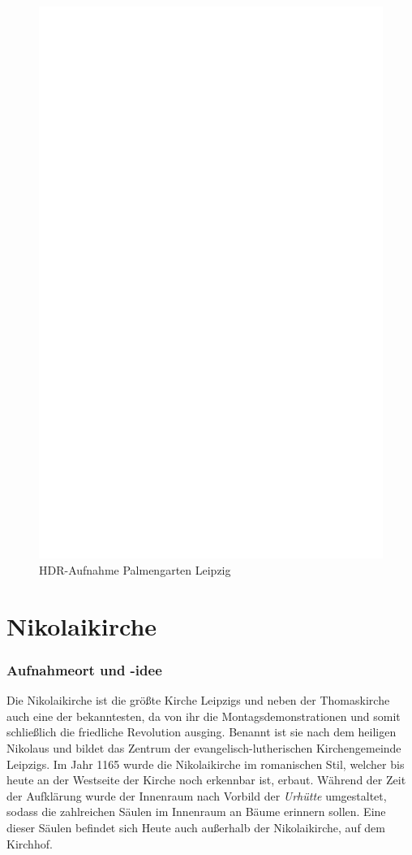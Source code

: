 \documentclass[liststotoc,bibtotoc,fontsize=14pt,]{scrreprt}
\begin{document}
\newpage
\begin{figure}[h]
	\includegraphics[width=\linewidth]{img/ph.jpg}
	\caption{HDR-Aufnahme Palmengarten Leipzig}
\end{figure}

\section{Nikolaikirche}
\label{sec:nikolai}
\subsubsection{Aufnahmeort und -idee}
Die Nikolaikirche ist die größte Kirche Leipzigs und neben der Thomaskirche auch eine der bekanntesten, da von ihr die Montagsdemonstrationen und somit schließlich die friedliche Revolution ausging. Benannt ist sie nach dem heiligen Nikolaus und bildet das Zentrum der evangelisch-lutherischen Kirchengemeinde Leipzigs. Im Jahr 1165 wurde die Nikolaikirche im romanischen Stil, welcher bis heute an der Westseite der Kirche noch erkennbar ist, erbaut. Während der Zeit der Aufklärung wurde der Innenraum nach Vorbild der \textit{Urhütte} umgestaltet, sodass die zahlreichen Säulen im Innenraum an Bäume erinnern sollen. Eine dieser Säulen befindet sich Heute auch außerhalb der Nikolaikirche, auf dem Kirchhof.
\end{document}
